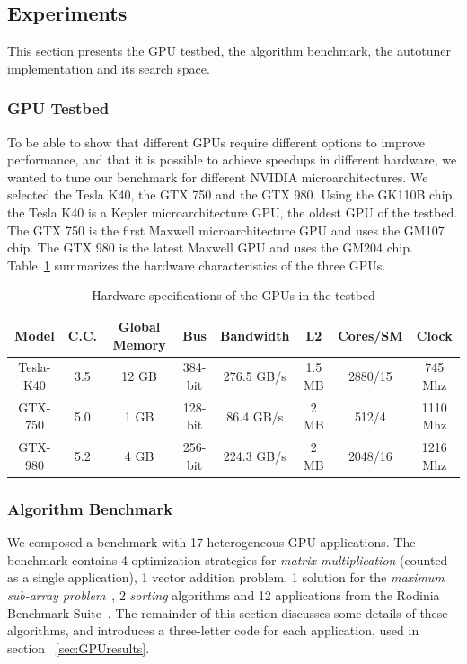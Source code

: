 \subsection{Experiments}

This section presents the GPU testbed, the algorithm benchmark, the
autotuner implementation and its search space.

\subsubsection{GPU Testbed}

To be able to show that different GPUs require different options to improve
performance, and that it is possible to achieve speedups in different hardware,
we wanted to tune our benchmark for different NVIDIA microarchitectures.  We
selected the Tesla K40, the GTX 750 and the GTX 980.  Using the GK110B chip,
the Tesla K40 is a Kepler microarchitecture GPU, the oldest GPU of the testbed.
The GTX 750 is the first Maxwell microarchitecture GPU and uses the GM107 chip.
The GTX 980 is the latest Maxwell GPU and uses the GM204 chip.
Table~\ref{tab:GPUs} summarizes the hardware characteristics of the three GPUs.

\begin{table}[thpb]
    \centering
    \footnotesize
    \begin{tabular}{cccccccc}
        \toprule
        \textbf{Model}&\textbf{C.C.}&\textbf{Global Memory}&\textbf{Bus}&\textbf{Bandwidth}&\textbf{L2}&\textbf{Cores/SM}&\textbf{Clock} \\ \midrule
        Tesla-K40&3.5&12 GB&384-bit&276.5 GB/s&1.5 MB&2880/15&745 Mhz \\ \midrule
        GTX-750&5.0&1 GB&128-bit&86.4 GB/s&2 MB&512/4&1110 Mhz \\ \midrule
        GTX-980&5.2&4 GB&256-bit&224.3 GB/s&2 MB&2048/16&1216 Mhz \\ \bottomrule
    \end{tabular}
    \caption{Hardware specifications of the GPUs in the testbed}
    \label{tab:GPUs}
\end{table}

\subsubsection{Algorithm Benchmark}

We composed a benchmark with 17 heterogeneous GPU applications.  The benchmark
contains 4 optimization strategies for \emph{matrix multiplication} (counted as
a single application), 1 vector addition problem, 1 solution for the
\emph{maximum sub-array problem}~\cite{ferreira2014parallel}, 2 \emph{sorting}
algorithms and 12 applications from the Rodinia Benchmark
Suite~\cite{che2009rodinia}.  The remainder of this section discusses some
details of these algorithms, and introduces a three-letter code for each
application, used in section ~\ref{sec:GPUresults}.

